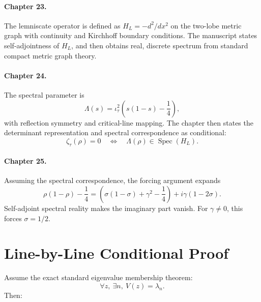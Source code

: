 \documentclass[11pt]{article}
\begin{document}
\paragraph{Chapter 23.}
The lemniscate operator is defined as \(H_L=-d^2/dx^2\) on the two-lobe metric
graph with continuity and Kirchhoff boundary conditions.  The manuscript states
self-adjointness of \(H_L\), and then obtains real, discrete spectrum from
standard compact metric graph theory.

\paragraph{Chapter 24.}
The spectral parameter is
\[
  \Lambda(s)=\iota_\tau^2\left(s(1-s)-\frac14\right),
\]
with reflection symmetry and critical-line mapping.  The chapter then states
the determinant representation and spectral correspondence as conditional:
\[
  \zeta_\tau(\rho)=0
  \quad\Longleftrightarrow\quad
  \Lambda(\rho)\in \operatorname{Spec}(H_L).
\]

\paragraph{Chapter 25.}
Assuming the spectral correspondence, the forcing argument expands
\[
  \rho(1-\rho)-\frac14
  =
  \left(\sigma(1-\sigma)+\gamma^2-\frac14\right)
  + i\gamma(1-2\sigma).
\]
Self-adjoint spectral reality makes the imaginary part vanish.  For
\(\gamma\ne0\), this forces \(\sigma=1/2\).

\section*{Line-by-Line Conditional Proof}

Assume the exact standard eigenvalue membership theorem:
\[
  \forall z,\ \exists n,\ V(z)=\lambda_n.
\]
Then:
\end{document}
